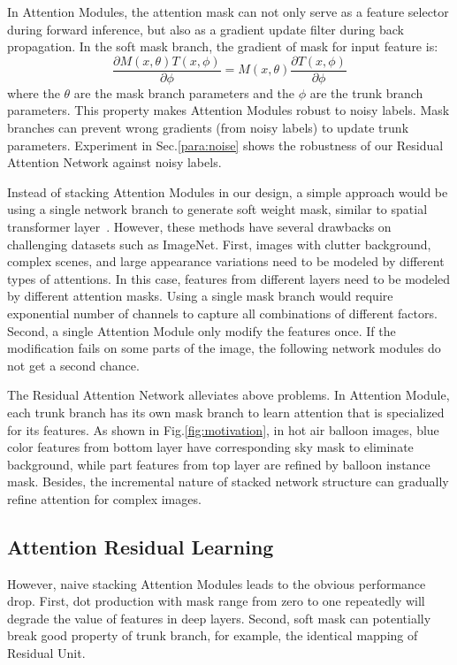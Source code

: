 \documentclass[10pt,twocolumn,letterpaper]{article}
\begin{document}
In Attention Modules, the attention mask can not only serve as a feature selector during forward inference, but also as a gradient update filter during back propagation. In the soft mask branch, the gradient of mask for input feature is:
\begin{equation}
\frac{\partial M(x, \theta)T(x,\phi)}{\partial \phi} = M(x, \theta)\frac{\partial T(x,\phi)}{\partial \phi}
\end{equation}
\noindent
where the $\theta$ are the mask branch parameters and the $\phi$ are the trunk branch parameters. This property makes Attention Modules robust to noisy labels. Mask branches can prevent wrong gradients (from noisy labels) to update trunk parameters. Experiment in Sec.\ref{para:noise} shows the robustness of our Residual Attention Network against noisy labels.

Instead of stacking Attention Modules in our design, a simple approach would be using a single network branch to generate soft weight mask, similar to spatial transformer layer~\cite{jaderberg2015spatial}. However, these methods have several drawbacks on challenging datasets such as ImageNet. First, images with clutter background, complex scenes, and large appearance variations need to be modeled by different types of attentions. In this case, features from different layers need to be modeled by different attention masks. Using a single mask branch would require exponential number of channels to capture all combinations of different factors. Second, a single Attention Module only modify the features once. If the modification fails on some parts of the image, the following network modules do not get a second chance.

The Residual Attention Network alleviates above problems. In Attention Module, each trunk branch has its own mask branch to learn attention that is specialized for its features. As shown in Fig.\ref{fig:motivation}, in hot air balloon images, blue color features from bottom layer have corresponding sky mask to eliminate background, while part features from top layer are refined by balloon instance mask. Besides, the incremental nature of stacked network structure can gradually refine attention for complex images.


\subsection{Attention Residual Learning}
However, naive stacking Attention Modules leads to the obvious performance drop. First, dot production with mask range from zero to one repeatedly will degrade the value of features in deep layers. Second, soft mask can potentially break good property of trunk branch, for example, the identical mapping of Residual Unit.
\end{document}
